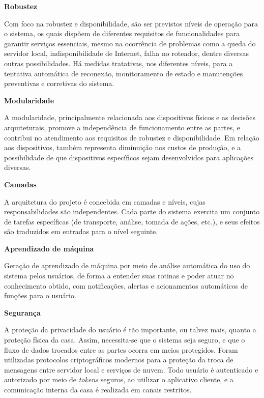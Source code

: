 \begin{description}
\item \textbf{Robustez}

Com foco na robustez e disponibilidade, são ser previstos níveis de operação para o sistema, os quais dispõem de diferentes requisitos de funcionalidades para garantir serviços essenciais, mesmo na ocorrência de problemas como a queda do servidor local, indisponibilidade de Internet, falha no roteador, dentre diversas outras possibilidades. Há medidas tratativas, nos diferentes níveis, para a tentativa automática de reconexão, monitoramento de estado e manutenções preventivas e corretivas do sistema.

\item \textbf{Modularidade}

A modularidade, principalmente relacionada aos dispositivos físicos e as decisões arquiteturais, promove a independência de funcionamento entre as partes, e contribui no atendimento aos requisitos de robustez e disponibilidade. Em relação aos dispositivos, também representa diminuição nos custos de produção, e a possibilidade de que dispositivos específicos sejam desenvolvidos para aplicações diversas.

\item \textbf{Camadas}

A arquitetura do projeto é concebida em camadas e níveis, cujas responsabilidades são independentes. Cada parte do sistema exercita um conjunto de tarefas específicas (de transporte, análise, tomada de ações, etc.), e seus efeitos são traduzidos em entradas para o nível seguinte.

\item \textbf{Aprendizado de máquina}

Geração de aprendizado de máquina por meio de análise automática do uso do sistema pelos usuários, de forma a entender suas rotinas e poder atuar no conhecimento obtido, com notificações, alertas e acionamentos automáticos de funções para o usuário.

\item \textbf{Segurança}

A proteção da privacidade do usuário é tão importante, ou talvez mais, quanto a proteção física da casa. Assim, necessita-se que o sistema seja seguro, e que o fluxo de dados trocados entre as partes ocorra em meios protegidos. Foram utilizadas protocolos criptográficos modernos para a proteção da troca de mensagens entre servidor local e serviços de nuvem. Todo usuário é autenticado e autorizado por meio de \emph{tokens} seguros, ao utilizar o aplicativo cliente, e a comunicação interna da casa é realizada em canais restritos.

\end{description}

